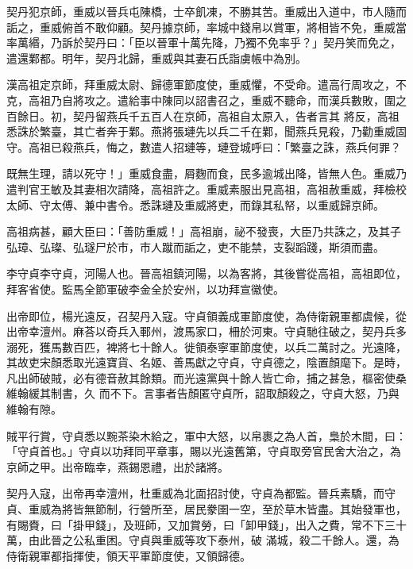 \begin{pinyinscope}
 契丹犯京師，重威以晉兵屯陳橋，士卒飢凍，不勝其苦。重威出入道中，市人隨而詬之，重威俯首不敢仰顧。契丹據京師，率城中錢帛以賞軍，將相皆不免，重威當率萬緡，乃訴於契丹曰：「臣以晉軍十萬先降，乃獨不免率乎？」契丹笑而免之，遣還鄴都。明年，契丹北歸，重威與其妻石氏詣虜帳中為別。



 漢高祖定京師，拜重威太尉、歸德軍節度使，重威懼，不受命。遣高行周攻之，不克，高祖乃自將攻之。遣給事中陳同以詔書召之，重威不聽命，而漢兵數敗，圍之百餘日。初，契丹留燕兵千五百人在京師，高祖自太原入，告者言其
 將反，高祖悉誅於繁臺，其亡者奔于鄴。燕將張璉先以兵二千在鄴，聞燕兵見殺，乃勸重威固守。高祖已殺燕兵，悔之，數遣人招璉等，璉登城呼曰：「繁臺之誅，燕兵何罪？



 既無生理，請以死守！」重威食盡，屑麴而食，民多逾城出降，皆無人色。重威乃遣判官王敏及其妻相次請降，高祖許之。重威素服出見高祖，高祖赦重威，拜檢校太師、守太傅、兼中書令。悉誅璉及重威將吏，而錄其私帑，以重威歸京師。



 高祖病甚，顧大臣曰：「善防重威！」高祖崩，祕不發喪，大臣乃共誅之，及其子弘璋、弘璨、弘璲尸於市，市人蹴而詬之，吏不能禁，支裂蹈踐，斯須而盡。



 李守貞李守貞，河陽人也。晉高祖鎮河陽，以為客將，其後嘗從高祖，高祖即位，拜客省使。監馬全節軍破李金全於安州，以功拜宣徽使。



 出帝即位，楊光遠反，召契丹入寇。守貞領義成軍節度使，為侍衛親軍都虞候，從出帝幸澶州。麻荅以奇兵入鄆州，渡馬家口，柵於河東。守貞馳往破之，契丹兵多溺死，獲馬數百匹，裨將七十餘人。徙領泰寧軍節度使，以兵二萬討之。光遠降，其故吏宋顏悉取光遠寶貨、名姬、善馬獻之守貞，守貞德之，陰置顏麾下。是時，凡出師破賊，必有德音赦其餘類。而光遠黨與十餘人皆亡命，捕之甚急，樞密使桑維翰緩其制書，久
 而不下。言事者告顏匿守貞所，詔取顏殺之，守貞大怒，乃與維翰有隙。



 賊平行賞，守貞悉以黦茶染木給之，軍中大怒，以帛裹之為人首，梟於木間，曰：「守貞首也。」守貞以功拜同平章事，賜以光遠舊第，守貞取旁官民舍大治之，為京師之甲。出帝臨幸，燕錫恩禮，出於諸將。



 契丹入寇，出帝再幸澶州，杜重威為北面招討使，守貞為都監。晉兵素驕，而守貞、重威為將皆無節制，行營所至，居民豢圉一空，至於草木皆盡。其始發軍也，有賜賚，曰「掛甲錢」，及班師，又加賞勞，曰「卸甲錢」，出入之費，常不下三十萬，由此晉之公私重困。守貞與重威等攻下泰州，破
 滿城，殺二千餘人。還，為侍衛親軍都指揮使，領天平軍節度使，又領歸德。




\end{pinyinscope}
